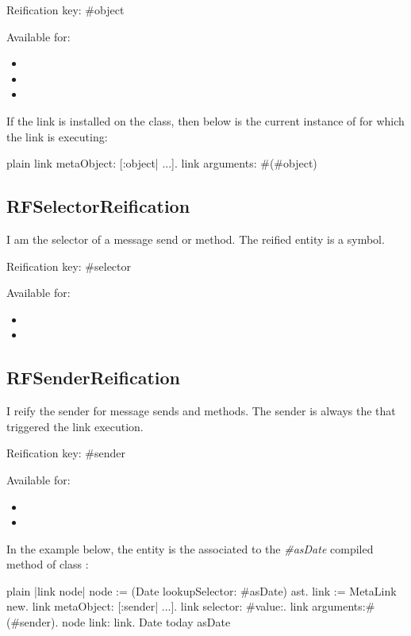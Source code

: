 \documentclass[10pt,twoside,english]{_support/latex/sbabook/sbabook}
\begin{document}
Reification key: \#object

Available for:

\begin{itemize}
\item {}
\item {}
\item {}
\end{itemize}

If the link is installed on the  class, then  below is the current instance of  for which the link is executing:

\begin{displaycode}{plain}
link metaObject: [:object| ...].
link arguments: #(#object)
\end{displaycode}
\subsection{RFSelectorReification}
I am the selector of a message send or method. The reified entity is a symbol.

Reification key: \#selector

Available for:

\begin{itemize}
\item {}
\item {}
\end{itemize}
\subsection{RFSenderReification}
I reify the sender for message sends and methods. The sender is always the  that triggered the link execution.

Reification key: \#sender

Available for:

\begin{itemize}
\item {}
\item {}
\end{itemize}

In the example below, the  entity is the  associated to the \textit{\#asDate} compiled method of class :

\begin{displaycode}{plain}
|link node|
node := (Date lookupSelector: #asDate) ast.
link := MetaLink new.
link metaObject: [:sender| ...].
link selector: #value:.
link arguments:#(#sender).
node link: link.
Date today asDate
\end{displaycode}
\end{document}
